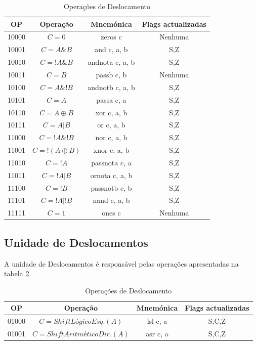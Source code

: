 \begin{table}[h]
	\centering
	\begin{tabular}{|c|c|c|c|}
		\hline
		OP    & Operação & Mnemónica & Flags actualizadas \\ \hline
		10000 & \mbox{$C=0$}    & zeros c   & Nenhuma  \\ \hline
		10001 & \mbox{$C=A\&B$}  & and c, a, b & S,Z   \\ \hline
		10010 & \mbox{$C=!A\&B$}  & andnota c, a, b & S,Z   \\ \hline
		10011 & \mbox{$C=B$}  & passb c, b &  Nenhuma  \\ \hline
		10100 & \mbox{$C=A\&!B$}  & andnotb c, a, b & S,Z   \\ \hline
		10101 & \mbox{$C=A$}  & passa c, a & S,Z   \\ \hline
		10110 & \mbox{$C=A \oplus B$}  & xor c, a, b & S,Z   \\ \hline
		10111 & \mbox{$C=A|B$}  & or c, a, b & S,Z   \\ \hline
		11000 & \mbox{$C=!A\&!B$}  & nor c, a, b & S,Z   \\ \hline
		11001 & \mbox{$C=!(A \oplus B)$}  & xnor c, a, b & S,Z   \\ \hline
		11010 & \mbox{$C=!A$}  & passnota c, a & S,Z   \\ \hline
		11011 & \mbox{$C=!A|B$}  & ornota c, a, b & S,Z   \\ \hline
		11100 & \mbox{$C=!B$}  & passnotb c, b & S,Z   \\ \hline
		11101 & \mbox{$C=!A|!B$}  & nand c, a, b & S,Z   \\ \hline
		11111 & \mbox{$C=1$}  & ones c & Nenhuma   \\ \hline
	\end{tabular}
	\caption{Operações de Deslocamento}
	\label{tabela:logic}
\end{table}
\newpage
\subsection{Unidade de Deslocamentos}
A unidade de Deslocamentos é responsável pelas operações apresentadas na tabela \ref{tabela:shift}.\\

\begin{table}[h]
	\centering
	\begin{tabular}{|c|c|c|c|}
		\hline
		OP    & Operação & Mnemónica & Flags actualizadas \\ \hline
		01000 & \mbox{$C=Shift Lógico Esq.(A)$}    & lsl c, a   & S,C,Z   \\ \hline
		01001 & \mbox{$C=Shift Aritmético Dir.(A)$}  & asr c, a & S,C,Z   \\ \hline
	\end{tabular}
	\caption{Operações de Deslocamento}
	\label{tabela:shift}
\end{table}

